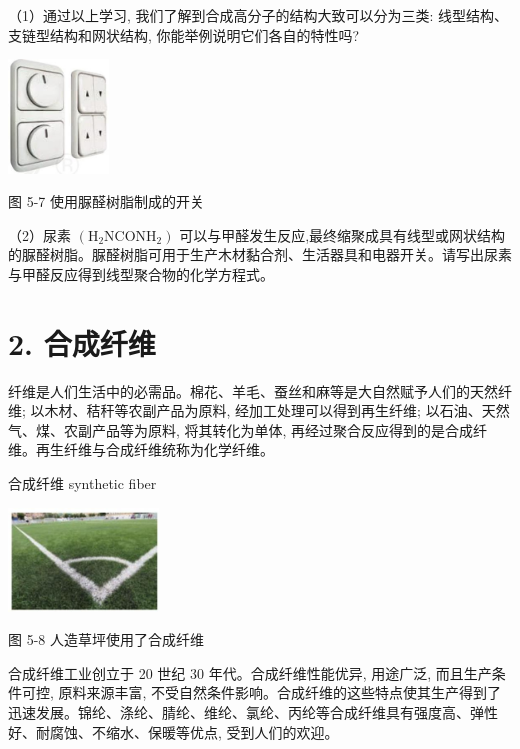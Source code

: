 \documentclass[10pt]{article}
\begin{document}
（1）通过以上学习, 我们了解到合成高分子的结构大致可以分为三类: 线型结构、支链型结构和网状结构, 你能举例说明它们各自的特性吗?

\begin{center}
\includegraphics[max width=0.2\textwidth]{images/0190efc5-b58a-7c43-bfb0-e0a030df9cfd_146_779390.jpg}
\end{center}

图 5-7 使用脲醛树脂制成的开关

（2）尿素 \(\left( {{\mathrm{H}}_{2}{\mathrm{{NCONH}}}_{2}}\right)\) 可以与甲醛发生反应,最终缩聚成具有线型或网状结构的脲醛树脂。脲醛树脂可用于生产木材黏合剂、生活器具和电器开关。请写出尿素与甲醛反应得到线型聚合物的化学方程式。

\section*{2. 合成纤维}

纤维是人们生活中的必需品。棉花、羊毛、蚕丝和麻等是大自然赋予人们的天然纤维; 以木材、秸秆等农副产品为原料, 经加工处理可以得到再生纤维; 以石油、天然气、煤、农副产品等为原料, 将其转化为单体, 再经过聚合反应得到的是合成纤维。再生纤维与合成纤维统称为化学纤维。

\begin{mdframed}

合成纤维 synthetic fiber

\end{mdframed}

\begin{center}
\includegraphics[max width=0.3\textwidth]{images/0190efc5-b58a-7c43-bfb0-e0a030df9cfd_147_817334.jpg}
\end{center}

图 5-8 人造草坪使用了合成纤维

合成纤维工业创立于 20 世纪 30 年代。合成纤维性能优异, 用途广泛, 而且生产条件可控, 原料来源丰富, 不受自然条件影响。合成纤维的这些特点使其生产得到了迅速发展。锦纶、涤纶、腈纶、维纶、氯纶、丙纶等合成纤维具有强度高、弹性好、耐腐蚀、不缩水、保暖等优点, 受到人们的欢迎。
\end{document}
